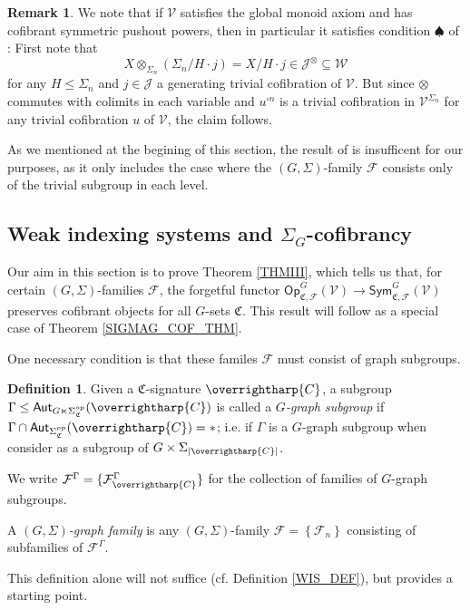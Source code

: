 \documentclass[a4paper,10pt
,draft
]{article}%
\numberwithin{equation}{section}
\numberwithin{figure}{section}
\theoremstyle{definition} %
\newtheorem{definition}[equation]{Definition}%
\newtheorem{remark}[equation]{Remark}%
\newcommand{\set}[1]{\left\{#1\right\}}%
\newcommand{\vect}[1]{\text{\overrightharp{\ensuremath{#1}}}}
\newcommand{\Sym}{\ensuremath{\mathsf{Sym}}}%
\newcommand{\Op}{\mathsf{Op}}%
\newcommand{\F}{\ensuremath{\mathcal F}}
\newcommand{\V}{\ensuremath{\mathcal V}}
\newcommand{\1}{\ensuremath{\mathbbm 1}}%
\begin{document}

\begin{remark}
      We note that if $\V$ satisfies the global monoid axiom and has cofibrant symmetric pushout powers,
      then in particular it satisfies condition $\spadesuit$ of \cite[Thm. 6.1.1]{WY18}:
      First note that
      \[
            X \otimes_{\Sigma_n} (\Sigma_n / H \cdot j) = X/H \cdot j \in \mathcal J^{\otimes} \subseteq \mathcal W
      \]
      for any $H \leq \Sigma_n$ and $j \in \mathcal J$ a generating trivial cofibration of $\V$.
      But since $\otimes$ commutes with colimits in each variable
      and $u^{\square n}$ is a trivial cofibration in $\V^{\Sigma_n}$ for any trivial cofibration $u$ of $\V$,
      the claim follows.

      As we mentioned at the begining of this section, the result of \cite[Thm. 6.1.1]{WY18} is insufficent for our purposes,
      as it only includes the case where
      the $(G,\Sigma)$-family $\F$ consists only of the trivial subgroup in each level.
\end{remark}






\newpage
\subsection{Weak indexing systems and $\Sigma_G$-cofibrancy}
\label{INDSYS SEC}

Our aim in this section is to prove Theorem \ref{THMIII},
which tells us that, for certain $(G,\Sigma)$-families $\F$, the forgetful functor
$\Op^G_{\mathfrak C, \F}(\V) \to \Sym^G_{\mathfrak C, \F}(\V)$ preserves cofibrant objects for all $G$-sets $\mathfrak C$.
This result will follow as a special case of Theorem \ref{SIGMAG_COF_THM}.

One necessary condition is that these familes $\F$ must consist of graph subgroups.
\begin{definition}
      \label{GRAPHSUB_DEF}
      Given a $\mathfrak{C}$-signature $\vect C$, 
      a subgroup 
      $\Gamma \leq \mathsf{Aut}_{G \ltimes \Sigma_{\mathfrak{C}}^{op}}(\vect C)$
      is called a \textit{$G$-graph subgroup} if
      $\Gamma \cap \mathsf{Aut}_{\Sigma_{\mathfrak{C}}^{op}}(\vect C) = \**$;
      i.e. if $\Gamma$ is a $G$-graph subgroup when consider as a subgroup of $G \times \Sigma_{|\vect C|}$.
      
      We write $\mathcal{F}^{\Gamma} = \{\mathcal{F}^{\Gamma}_{\vect C}\}$
      for the collection of families of $G$-graph subgroups.

      A \textit{$(G,\Sigma)$-graph family} is any $(G,\Sigma)$-family $\mathcal F = \set{\F_n}$ consisting of subfamilies of $\F^\Gamma$.
\end{definition}
This definition alone will not suffice (cf. Definition \ref{WIS_DEF}), but provides a starting point.
\end{document}
